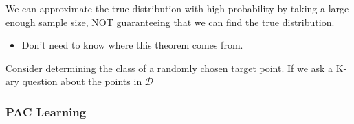 \begin{warning}
    We can approximate the true distribution with high probability by taking a large enough sample size, NOT guaranteeing that we can find the true distribution.
    \begin{itemize}
        \item Don't need to know where this theorem comes from.
    \end{itemize}
\end{warning}

Consider determining the class of a randomly chosen target point. If we ask a K-ary question about the points in $\mathcal{D}$

\subsubsection{PAC Learning}



